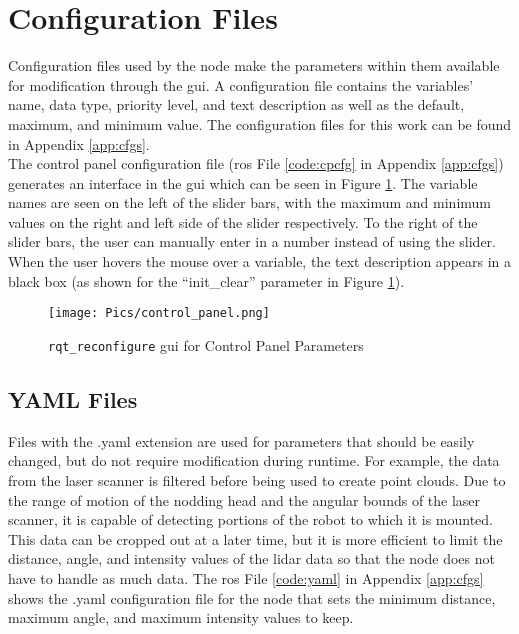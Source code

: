 \section{Configuration Files}
Configuration files used by the  node make the parameters within them available for modification through the  \acrshort{gui}. A configuration file contains the variables' name, data type, priority level, and text description as well as the default, maximum, and minimum value. The configuration files for this work can be found in Appendix \ref{app:cfgs}.\\

The control panel configuration file (\acrshort{ros} File \ref{code:cpcfg} in Appendix \ref{app:cfgs}) generates an interface in the  \acrshort{gui} which can be seen in Figure \ref{fig:cpgui}. The variable names are seen on the left of the slider bars, with the maximum and minimum values on the right and left side of the slider respectively. To the right of the slider bars, the user can manually enter in a number instead of using the slider. When the user hovers the mouse over a variable, the text description appears in a black box (as shown for the ``init\_clear'' parameter in Figure \ref{fig:cpgui}).

\begin{figure}[h]
    \centering
    \texttt{[image: Pics/control\_panel.png]}
    \caption{\texttt{rqt\_reconfigure} \acrshort{gui} for Control Panel Parameters}
    \label{fig:cpgui}
\end{figure}

\subsection{YAML Files}
Files with the .yaml extension are used for parameters that should be easily changed, but do not require modification during runtime. For example, the data from the laser scanner is filtered before being used to create point clouds. Due to the range of motion of the nodding head and the angular bounds of the laser scanner, it is capable of detecting portions of the robot to which it is mounted. This data can be cropped out at a later time, but it is more efficient to limit the distance, angle, and intensity values of the \acrshort{lidar} data so that the  node does not have to handle as much data. The \acrshort{ros} File \ref{code:yaml} in Appendix \ref{app:cfgs} shows the .yaml configuration file for the  node that sets the minimum distance, maximum angle, and maximum intensity values to keep.\\

